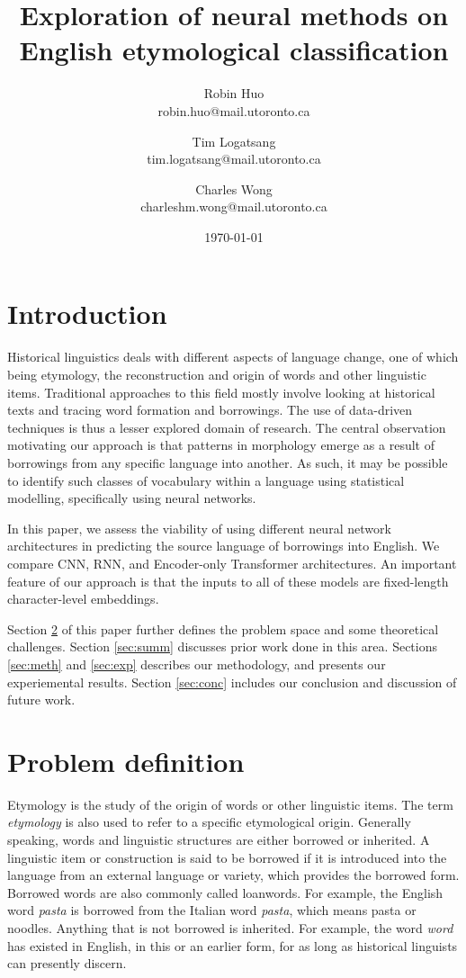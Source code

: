 \documentclass[11pt]{article}
\title{\vspace{-3cm}Exploration of neural methods on English etymological classification}
\date{\today}
\author{Robin Huo \\ robin.huo@mail.utoronto.ca
\and Tim Logatsang \\ tim.logatsang@mail.utoronto.ca
\and Charles Wong \\ charleshm.wong@mail.utoronto.ca}
\begin{document}
	\maketitle
	
	\section{Introduction}
	
	Historical linguistics deals with different aspects of language change, one of which being etymology, the reconstruction and origin of words and other linguistic items. Traditional approaches to this field mostly involve looking at historical texts and tracing word formation and borrowings. The use of data-driven techniques is thus a lesser explored domain of research. The central observation motivating our approach is that patterns in morphology emerge as a result of borrowings from any specific language into another. As such, it may be possible to identify such classes of vocabulary within a language using statistical modelling, specifically using neural networks.
	
	In this paper, we assess the viability of using different neural network architectures in predicting the source language of borrowings into English. We compare CNN, RNN, and Encoder-only Transformer architectures. An important feature of our approach is that the inputs to all of these models are fixed-length character-level embeddings.
	
	Section \ref{sec:prob} of this paper further defines the problem space and some theoretical challenges. Section \ref{sec:summ} discusses prior work done in this area. Sections \ref{sec:meth} and \ref{sec:exp} describes our methodology, and presents our experiemental results. Section \ref{sec:conc} includes our conclusion and discussion of future work.
	
	\section{Problem definition} \label{sec:prob}        %
	Etymology is the study of the origin of words or other linguistic items.
	The term \textit{etymology} is also used to refer to a specific etymological origin.
	Generally speaking, words and linguistic structures are either borrowed or inherited.
	A linguistic item or construction is said to be borrowed if it is introduced into the language from an external language or variety, which provides the borrowed form.
	Borrowed words are also commonly called loanwords.
	For example, the English word \textit{pasta} is borrowed from the Italian word \textit{pasta}, which means pasta or noodles.
	Anything that is not borrowed is inherited.
	For example, the word \textit{word} has existed in English, in this or an earlier form, for as long as historical linguists can presently discern.
	
\end{document}
